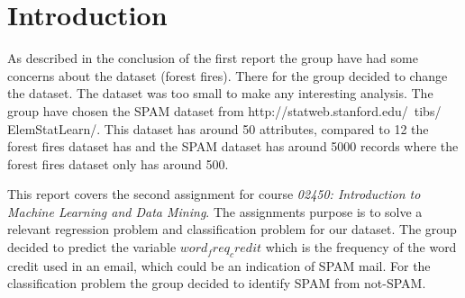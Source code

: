 \section{Introduction}
\label{sec:intro}

As described in the conclusion of the first report the group have had some concerns about the dataset (forest fires). There for the group decided to change the dataset. The dataset was too small to make any interesting analysis. The group have chosen the SPAM dataset from http://statweb.stanford.edu/~tibs/ ElemStatLearn/. This dataset has around 50 attributes, compared to 12 the forest fires dataset has and the SPAM dataset has around 5000 records where the forest fires dataset only has around 500.


This report covers the second assignment for course \textit{02450: Introduction to Machine Learning and Data Mining}. The assignments purpose is to solve a relevant regression problem and classification problem for our dataset. The group decided to predict the variable $word_freq_credit$ which is the frequency of the word credit used in an email, which could be an indication of SPAM mail. For the classification problem the group decided to identify SPAM from not-SPAM.